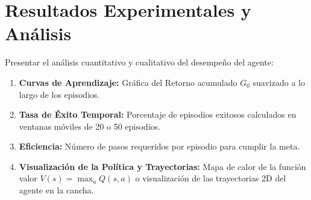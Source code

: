 \section{Resultados Experimentales y Análisis}
Presentar el análisis cuantitativo y cualitativo del desempeño del agente:

\begin{enumerate}
    \item \textbf{Curvas de Aprendizaje:} Gráfica del Retorno acumulado $G_0$ suavizado a lo largo de los episodios.
    \item \textbf{Tasa de Éxito Temporal:} Porcentaje de episodios exitosos calculados en ventanas móviles de 20 o 50 episodios.
    \item \textbf{Eficiencia:} Número de pasos requeridos por episodio para cumplir la meta.
    \item \textbf{Visualización de la Política y Trayectorias:} Mapa de calor de la función valor $V(s) = \max_a Q(s, a)$ o visualización de las trayectorias 2D del agente en la cancha.
\end{enumerate}
